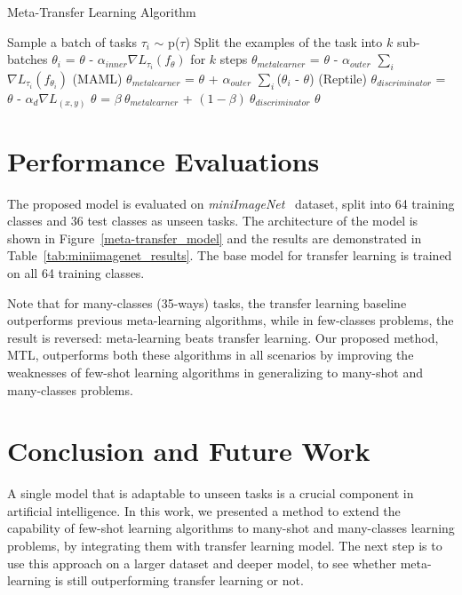 \documentclass[letterpaper]{article}
\begin{document}
\begin{algorithm}
\caption{Meta-Transfer Learning Algorithm}\label{basic}
\begin{algorithmic}[1]  
        \State Sample a batch of tasks $\tau_i$ $\sim$ p($\tau$)
        \State Split the examples of the task into $k$ sub-batches
        \State $\theta_i$ = $\theta$ - $\alpha_{inner} \nabla L_{\tau_i}(f_\theta)$ for $k$ steps
        \EndFor
        \State $\theta_{metalearner}$ = $\theta$ - $\alpha_{outer}$ $\sum_{i}$ $\nabla L_{\tau_i}(f_{\theta_i})$ (MAML)
        \State $\theta_{metalearner}$ = $\theta$ + $\alpha_{outer}$ $\sum_{i}$($\theta_i$ - $\theta$) (Reptile)
        \State $\theta_{discriminator}$ = $\theta$ - $\alpha_{d} \nabla L_{(x,y)}$
        \State $\theta$ = $\beta~\theta_{metalearner}$ + $(1-\beta)~\theta_{discriminator}$
      \EndFor
	\State \Return $\theta$
\end{algorithmic}
\end{algorithm}

\section{Performance Evaluations}
The proposed model is evaluated on \textit{miniImageNet}~\cite{MatchingNetwork} dataset, split into 64 training classes and 36 test classes as unseen tasks. The architecture of the model is shown in Figure~\ref{meta-transfer_model} and the results are demonstrated in Table~\ref{tab:miniimagenet_results}. The base model for transfer learning is trained on all 64 training classes.

Note that for many-classes (35-ways) tasks, the transfer learning baseline outperforms previous meta-learning algorithms, while in few-classes problems, the result is reversed: meta-learning beats transfer learning. Our proposed method, MTL, outperforms both these algorithms in all scenarios by improving the weaknesses of few-shot learning algorithms in generalizing to many-shot and many-classes problems. 

\section{Conclusion and Future Work}
A single model that is adaptable to unseen tasks is a crucial component in artificial intelligence. In this work, we presented a method to extend the capability of few-shot learning algorithms to many-shot and many-classes learning problems, by integrating them with transfer learning model. The next step is to use this approach on a larger dataset and deeper model, to see whether meta-learning is still outperforming transfer learning or not.



\end{document}
